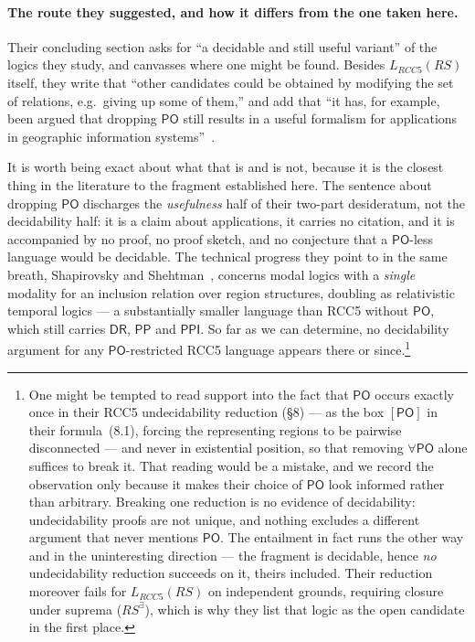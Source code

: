 \documentclass[11pt]{article}
\newcommand{\DR}{\mathsf{DR}}
\newcommand{\PO}{\mathsf{PO}}
\newcommand{\PP}{\mathsf{PP}}
\newcommand{\PPI}{\mathsf{PPI}}
\newcommand{\LRCC}[1]{\ensuremath{L_{\mathit{RCC#1}}}}
\theoremstyle{plain}
\theoremstyle{definition}
\begin{document}
\paragraph{The route they suggested, and how it differs from the one taken
here.} Their concluding section asks for ``a decidable and still useful
variant'' of the logics they study, and canvasses where one might be found.
Besides $\LRCC{5}(\mathit{RS})$ itself, they write that ``other candidates
could be obtained by modifying the set of relations, e.g.\ giving up some of
them,'' and add that ``it has, for example, been argued that dropping
$\PO$ still results in a useful formalism for applications in geographic
information systems''~\cite[p.~31]{LutzWolter2006}.

It is worth being exact about what that is and is not, because it is the
closest thing in the literature to the fragment established here. The
sentence about dropping $\PO$ discharges the \emph{usefulness} half of their
two-part desideratum, not the decidability half: it is a claim about
applications, it carries no citation, and it is accompanied by no proof, no
proof sketch, and no conjecture that a $\PO$-less language would be
decidable. The technical progress they point to in the same breath,
Shapirovsky and Shehtman~\cite{ShapirovskyShehtman2005}, concerns modal
logics with a \emph{single} modality for an inclusion relation over region
structures, doubling as relativistic temporal logics --- a substantially
smaller language than RCC5 without $\PO$, which still carries $\DR$, $\PP$
and $\PPI$. So far as we can determine, no decidability argument for any
$\PO$-restricted RCC5 language appears there or since.\footnote{One might be
tempted to read support into the fact that $\PO$ occurs exactly once in
their RCC5 undecidability reduction (\S8) --- as the box $[\PO]$ in their
formula~(8.1), forcing the representing regions to be pairwise disconnected
--- and never in existential position, so that removing $\forall\PO$ alone
suffices to break it. That reading would be a mistake, and we record the
observation only because it makes their choice of $\PO$ look informed rather
than arbitrary. Breaking one reduction is no evidence of decidability:
undecidability proofs are not unique, and nothing excludes a different
argument that never mentions $\PO$. The entailment in fact runs the other
way and in the uninteresting direction --- the fragment is decidable, hence
\emph{no} undecidability reduction succeeds on it, theirs included. Their
reduction moreover fails for $\LRCC{5}(\mathit{RS})$ on independent grounds,
requiring closure under suprema ($\mathit{RS}^\exists$), which is why they
list that logic as the open candidate in the first place.}
\end{document}
